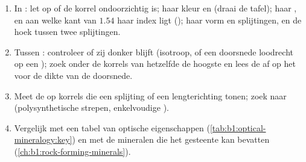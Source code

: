 \begin{method}\label{met:b1:optical-mineralogy:identify}
\begin{enumerate}
  \item In : let op of de korrel ondoorzichtig is; haar kleur en  (draai de tafel); haar , en aan welke kant van $1.54$
        haar index ligt (); haar vorm en splijtingen, en de hoek tussen twee splijtingen.
  \item Tussen : controleer of zij donker blijft (isotroop, of een doorsnede loodrecht op een ); zoek onder de korrels van hetzelfde
         de hoogste  en lees de  af op het  voor de dikte van de doorsnede.
  \item Meet de  op korrels die een splijting of een lengterichting tonen; zoek naar  (polysynthetische strepen, enkelvoudige ).
  \item Vergelijk met een tabel van optische eigenschappen (\cref{tab:b1:optical-mineralogy:key}) en met de mineralen die het gesteente kan bevatten
        (\cref{ch:b1:rock-forming-minerals}).
\end{enumerate}
\end{method}

